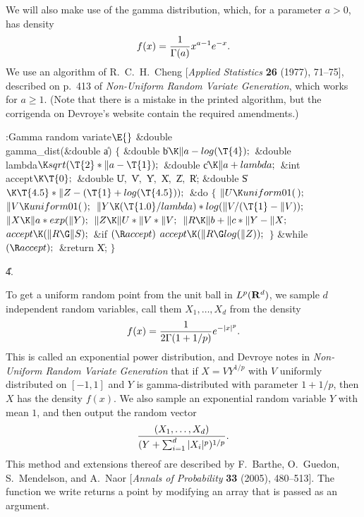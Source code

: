 We will also make use of the gamma distribution, which, for a parameter
$a>0$, has density
$$f(x) = {1\over \Gamma(a)}x^{a-1}e^{-x}.$$
We use an algorithm of R.~C.~H.~Cheng [{\sl Applied Statistics} {\bf 26}
(1977), 71--75], described on
p.~413 of {\sl Non-Uniform Random Variate Generation}, which works for $a\ge
1$. (Note that there is
a mistake in the printed algorithm, but the corrigenda on Devroye's website
contain the required amendments.)

\Y\B\4:Gamma random variate\X${}\E{}$\6
\&{double} \\{gamma\_dist}(\&{double} \|a)\1\1\2\2\6
${}\{{}$\1\6
\&{double} \|b${}\K\|a-\\{log}(\T{4});{}$\6
\&{double} \\{lambda}${}\K\\{sqrt}(\T{2}*\|a-\T{1});{}$\6
\&{double} \|c${}\K\|a+\\{lambda};{}$\6
\&{int} \\{accept}${}\K\T{0};{}$\6
\&{double} \|U${},{}$ \|V${},{}$ \|Y${},{}$ \|X${},{}$ \|Z${},{}$ \|R;\6
\&{double} \|S${}\K\T{4.5}*\|Z-(\T{1}+\\{log}(\T{4.5}));{}$\7
\&{do}\5
${}\{{}$\1\6
${}\|U\K\\{uniform01}(\,);{}$\6
${}\|V\K\\{uniform01}(\,);{}$\6
${}\|Y\K(\T{1.0}/\\{lambda})*\\{log}(\|V/(\T{1}-\|V));{}$\6
${}\|X\K\|a*\\{exp}(\|Y);{}$\6
${}\|Z\K\|U*\|V*\|V;{}$\6
${}\|R\K\|b+\|c*\|Y-\|X;{}$\6
${}\\{accept}\K(\|R\G\|S);{}$\6
\&{if} ${}(\R\\{accept}){}$\1\5
${}\\{accept}\K(\|R\G\\{log}(\|Z));{}$\2\6
\4${}\}{}$\2\5
\&{while} ${}(\R\\{accept});{}$\6
\&{return} \|X;\6
\4${}\}{}$\2\par
\U4.\fi

To get a uniform random point from the unit ball in $L^p({\bf R}^d)$, we
sample $d$ independent
random variables, call them $X_1,\ldots, X_d$ from the density
$$f(x) = {1\over 2\Gamma(1+1/p)} e^{-\vert x\vert ^p}.$$
This is called an exponential power distribution, and Devroye notes in {\sl
Non-Uniform Random Variate Generation}
that if $X = VY^{1/p}$ with $V$ uniformly distributed on $[-1,1]$ and $Y$ is
gamma-distributed with parameter
$1+1/p$, then $X$ has the density $f(x)$.
We also sample an exponential random variable $Y$ with mean $1$, and then
output the random vector
$${(X_1, \ldots, X_d) \over (Y+ \sum_{i=1}^d \vert X_i\vert^p)^{1/p}}.$$
This method and extensions thereof are described by F.~Barthe, O.~Guedon,
S.~Mendelson, and A.~Naor
[{\sl Annals of Probability} {\bf 33} (2005), 480--513].
The function we write returns a point by modifying an
array that is passed as an argument.

